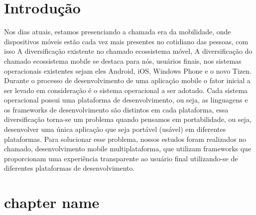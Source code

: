 \chapter{Introdução} %
\label{cha:introducao}

Nos dias atuais, estamos presenciando a chamada era da mobilidade, onde dispositivos móveis estão cada vez mais presentes no cotidiano das pessoas, com
isso  A diversificação existente no chamado ecossistema móvel,
A diversificação do chamado ecossistema mobile se destaca para nós, usuários finais, nos sistemas operacionais existentes sejam eles Android, iOS, Windows Phone e o novo Tizen. Durante o processo de desenvolvimento de uma aplicação mobile o fator inicial a ser levado em consideração é o sistema operacional a ser adotado. Cada sistema operacional possui uma plataforma de desenvolvimento, ou seja, as linguagens e os frameworks de desenvolvimento são distintos em cada plataforma, essa diversificação torna-se um problema quando pensamos em portabilidade, ou seja, desenvolver uma única aplicação que seja portável (usável) em diferentes plataformas. Para solucionar esse problema, nossos estudos foram realizados no chamado, desenvolvimento mobile multiplataforma, que utilizam frameworks que proporcionam uma experiência transparente ao usuário final utilizando-se de diferentes plataformas de desenvolvimento.

\chapter{chapter name} %
\label{cha:chapter_name}


